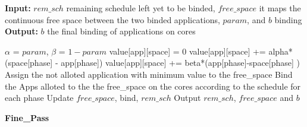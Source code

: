 \documentclass[10pt, conference]{IEEEtran}
\begin{document}
\begin{algorithm}[tb]
\footnotesize
\textbf{Input:} $rem\_sch$ remaining schedule left yet to be binded, $free\_space$ it maps the continuous free space between the two binded applications, $param$, and  $b$ binding
\textbf{Output:} $b$ the final binding of applications on cores
\begin{algorithmic}[1]
\STATE $\alpha$ = $param$, $\beta$ = $1-param$
\STATE value[app][space] = 0
\STATE value[app][space] += alpha*(space[phase] - app[phase])
\ELSE   
\STATE value[app][space] += beta*(app[phase]-space[phase] )
\ENDIF
\STATE Assign the not alloted application with minimum value to the free\_space
\STATE Bind the Apps alloted to the the free\_space on the cores according to the schedule for each phase
\STATE Update $free\_space$, bind, $rem\_sch$ 
\ENDFOR
\ENDFOR
\ENDFOR
\STATE Output $rem\_sch$, $free\_space$ and $b$
\end{algorithmic}
\caption{\textbf{Fine\_Pass}}
\vspace{-0.1cm}
\label{algLRP2}
\end{algorithm}
\end{document}
